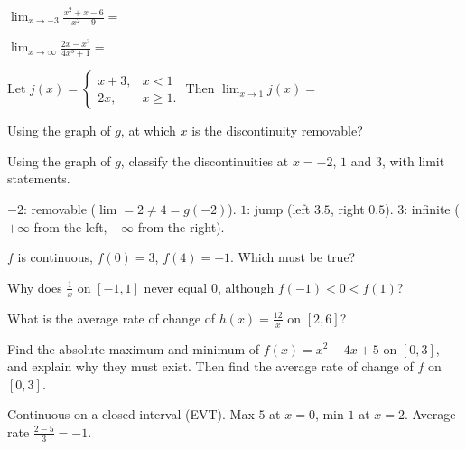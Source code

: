 \begin{exo}{}
$\displaystyle\lim_{x\to-3}\frac{x^2+x-6}{x^2-9}=$
\end{exo}
\begin{exo}{}
$\displaystyle\lim_{x\to\infty}\frac{2x-x^3}{4x^3+1}=$
\end{exo}
\begin{exo}{}
Let $j(x)=\begin{cases}x+3, & x<1\\ 2x, & x\ge1.\end{cases}$ Then $\displaystyle\lim_{x\to1}j(x)=$
\end{exo}
\gWd
\begin{exo}{}
Using the graph of $g$, at which $x$ is the discontinuity removable?
\end{exo}
\begin{exo}{}
Using the graph of $g$, classify the discontinuities at $x=-2$, $1$ and $3$, with limit statements.
\work{3cm}
\begin{solution}
$-2$: removable ($\lim=2\neq4=g(-2)$). $1$: jump (left $3.5$, right $0.5$). $3$: infinite ($+\infty$ from the left, $-\infty$ from the right).
\end{solution}
\end{exo}

\begin{exo}{}
$f$ is continuous, $f(0)=3$, $f(4)=-1$. Which must be true?
\end{exo}
\begin{exo}{}
Why does $\frac1x$ on $[-1,1]$ never equal $0$, although $f(-1)<0<f(1)$?
\end{exo}
\begin{exo}{}
What is the average rate of change of $h(x)=\frac{12}{x}$ on $[2,6]$?
\end{exo}
\begin{exo}{}
Find the absolute maximum and minimum of $f(x)=x^2-4x+5$ on $[0,3]$, and explain why they must exist. Then find the average rate of change of $f$ on $[0,3]$.
\work{3.5cm}
\begin{solution}
Continuous on a closed interval (EVT). Max $5$ at $x=0$, min $1$ at $x=2$. Average rate $\frac{2-5}{3}=-1$.
\end{solution}
\end{exo}

